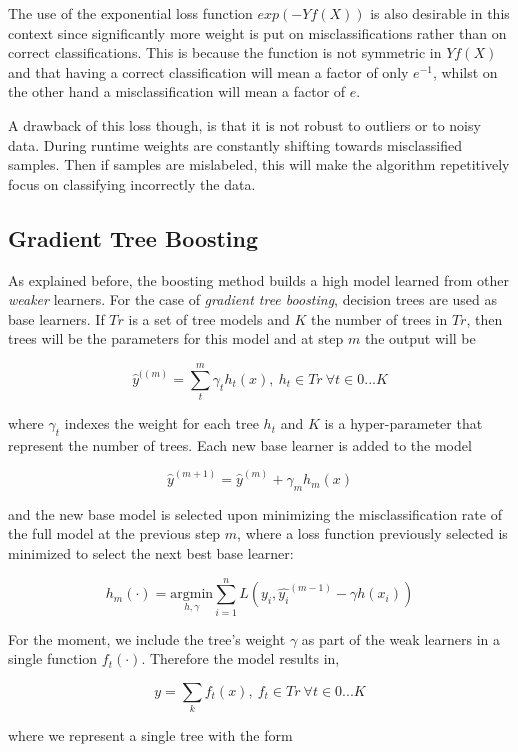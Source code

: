 The use of the exponential loss function $exp(-Yf(X))$ is also desirable in this context since significantly more weight is put on misclassifications rather than on correct classifications. This is because the function is not symmetric in $Yf(X)$ and that having a correct classification will mean a factor of only $e^{-1}$, whilst on the other hand a misclassification will mean a factor of $e$.

A drawback of this loss though, is that it is not robust to outliers or to noisy data. During runtime weights are constantly shifting towards misclassified samples. Then if samples are mislabeled, this will make the algorithm repetitively focus on classifying incorrectly the data.



\subsection{Gradient Tree Boosting}

As explained before, the boosting method builds a high model learned from other \textit{weaker} learners. For the case of \textit{gradient tree boosting}, decision trees are used as base learners. If $Tr$ is a set of tree models and $K$ the number of trees in $Tr$, then trees will be the parameters for this model and at step $m$ the output will be

\[
\hat{y}^{((m)}=  \sum_t^m \gamma_t h_t(x) , \  h_t \in Tr \ \forall t \in {0...K}
\]

where $\gamma_t$ indexes the weight for each tree $h_t$ and $K$ is a hyper-parameter that represent the number of trees. Each new base learner is added to the model

\[
\hat{y}^{(m+1)} =   \hat{y}^{(m)}  + \gamma_m h_m(x)
\]

and the new base model is selected upon minimizing the misclassification rate of the full model at the previous step $m$, where a loss function previously selected is minimized to select the next best base learner:

\[
h_m(\cdot) = \underset{h,\gamma}{\mathrm{argmin}}   \sum_{i=1}^{n} L ( y_i,  \hat{y_i}^{(m-1)} -  \gamma h(x_i)  )
\]


For the moment, we include the tree's weight $\gamma$ as part of the weak learners in a single function $f_t(\cdot)$. Therefore the model results in,

\[
y =  \sum_k f_t(x) ,  \ f_t \in Tr  \ \forall t \in {0...K}
\]

where we represent a single tree with the form

